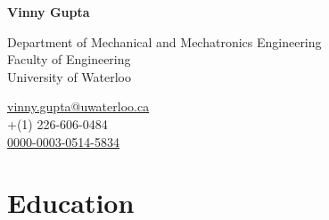 \documentclass[12pt,letterpaper]{report}
\newcommand{\namefont}[1]{{\normalfont\bfseries\Huge{#1}}}
\begin{document}
    \raggedright

    \namefont{Vinny Gupta}

    \vspace{1em}
    \begin{minipage}[t]{0.700\textwidth}
		Department of Mechanical and Mechatronics Engineering	\\        
        Faculty of Engineering \\
        University of Waterloo
    \end{minipage}
    \begin{minipage}[t]{0.295\textwidth}
        \flushright{}
        \href{mailto:vinny.gupta@uwaterloo.ca}{vinny.gupta@uwaterloo.ca} \\
        +(1) 226-606-0484 \\
        \href{https://orcid.org/0000-0003-0514-5834}{0000-0003-0514-5834}
    \end{minipage}


    
	    \section*{Education}
\end{document}
